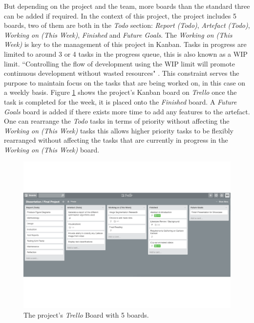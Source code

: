 \documentclass[report, 11pt, oneside]{dissertation}
\begin{document}
 But depending on the project and the team, more boards than the standard three can be added if required. In the context of this project, the project includes 5 boards, two of them are both in the \textit{Todo} section: \textit{Report (Todo)},  \textit{Artefact (Todo)},  \textit{Working on (This Week)},  \textit{Finished} and  \textit{Future Goals}. The \textit{Working on (This Week)} is key to the management of this project in Kanban. Tasks in progress are limited to around 3 or 4 tasks in the progress queue, this is also known as a WIP limit. ``Controlling the flow of development using the WIP limit will promote continuous development without wasted resources" \citep{Nakazawa:2016ip}. This constraint serves the purpose to maintain focus on the tasks that are being worked on, in this case on a weekly basis. Figure \ref{fig:trello_2} shows the project's Kanban board on \textit{Trello} once the task is completed for the week, it is placed onto the \textit{Finished} board. A \textit{Future Goals} board is added if there exists more time to add any features to the artefact. One can rearrange the \textit{Todo} tasks in terms of priority without affecting the \textit{Working on (This Week)} tasks this allows higher priority tasks to be flexibly rearranged without affecting the tasks that are currently in progress in the \textit{Working on (This Week)} board.
 
 \begin{figure}[!htb]
	\centering
	\includegraphics[scale=0.55]{figure_18.pdf}
	\caption[This project's \textit{Trello} board.]{The project's \textit{Trello} Board with 5 boards.}
	\label{fig:trello_2}
\end{figure}
\end{document}
